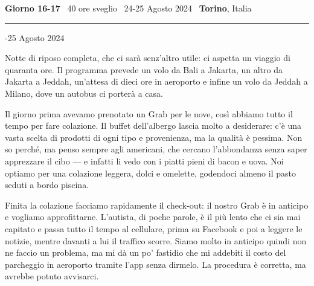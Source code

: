 \begin{center}
    {\large \textbf{Giorno 16-17} \textbar\ 40 ore sveglio \textbar\ 24-25 Agosto 2024 \textbar\ \textbf{Torino}, Italia}
\end{center}

\noindent\rule{\textwidth}{0.4pt}








-25 Agosto 2024 \newline

Notte di riposo completa, che ci sarà senz'altro utile: ci aspetta un viaggio di quaranta ore. Il programma prevede un volo da Bali a Jakarta, un altro da Jakarta a Jeddah, un'attesa di dieci ore in aeroporto e infine un volo da Jeddah a Milano, dove un autobus ci porterà a casa.

Il giorno prima avevamo prenotato un Grab per le nove, così abbiamo tutto il tempo per fare colazione. Il buffet dell'albergo lascia molto a desiderare: c'è una vasta scelta di prodotti di ogni tipo e provenienza, ma la qualità è pessima. Non so perché, ma penso sempre agli americani, che cercano l'abbondanza senza saper apprezzare il cibo — e infatti li vedo con i piatti pieni di bacon e uova. Noi optiamo per una colazione leggera, dolci e omelette, godendoci almeno il pasto seduti a bordo piscina.

Finita la colazione facciamo rapidamente il check-out: il nostro Grab è in anticipo e vogliamo approfittarne. L'autista, di poche parole, è il più lento che ci sia mai capitato e passa tutto il tempo al cellulare, prima su Facebook e poi a leggere le notizie, mentre davanti a lui il traffico scorre. Siamo molto in anticipo quindi non ne faccio un problema, ma mi dà un po' fastidio che mi addebiti il costo del parcheggio in aeroporto tramite l'app senza dirmelo. La procedura è corretta, ma avrebbe potuto avvisarci.

